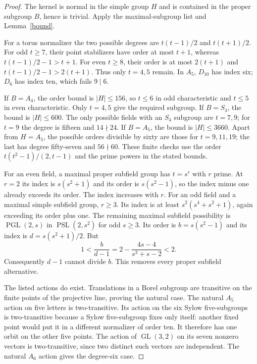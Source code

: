 \documentclass[11pt]{article}
\newcommand{\PSL}{\operatorname{PSL}}
\newcommand{\PGL}{\operatorname{PGL}}
\begin{document}
\begin{proof}
The kernel is normal in the simple group $H$ and is contained in
the proper subgroup $B$, hence is trivial. Apply the maximal-subgroup
list and Lemma~\ref{bound}.

For a torus normalizer the two possible degrees are
$t(t-1)/2$ and $t(t+1)/2$. For odd $t\geq7$, their point
stabilizers have order at most $t+1$, whereas
$t(t-1)/2-1>t+1$. For even $t\geq8$, their order is at most
$2(t+1)$ and $t(t-1)/2-1>2(t+1)$. Thus only $t=4,5$
remain. In $A_5$, $D_{10}$ has index six; $D_6$ has index ten,
which fails $9\mid6$.

If $B=A_4$, the order bound is $|H|\leq156$, so $t\leq6$
in odd characteristic and $t\leq5$ in even characteristic.
Only $t=4,5$ give the required subgroup. If $B=S_4$, the bound
is $|H|\leq600$. The only possible fields with an $S_4$
subgroup are $t=7,9$; for $t=9$ the degree is fifteen and
$14\nmid24$. If $B=A_5$, the bound is $|H|\leq3660$.
Apart from $H=A_5$, the possible orders divisible by sixty are
those for $t=9,11,19$; the last has degree fifty-seven and
$56\nmid60$. These finite checks use the order
$t(t^2-1)/(2,t-1)$ and the prime powers in the stated bounds.

For an even field, a maximal proper subfield group has $t=s^r$
with $r$ prime. At $r=2$ its index is $s(s^2+1)$ and its
order is $s(s^2-1)$, so the index minus one already exceeds
its order. The index increases with $r$. For an odd field and
a maximal simple subfield group, $r\geq3$. Its index is at least
$s^2(s^4+s^2+1)$, again exceeding its order plus one. The
remaining maximal subfield possibility is $\PGL(2,s)$ in
$\PSL(2,s^2)$ for odd $s\geq3$. Its order is
$b=s(s^2-1)$ and its index is $d=s(s^2+1)/2$. But
\[
 1<\frac{b}{d-1}
   =2-\frac{4s-4}{s^3+s-2}<2.
\]
Consequently $d-1$ cannot divide $b$. This removes every proper
subfield alternative.

The listed actions do exist. Translations in a Borel subgroup are
transitive on the finite points of the projective line, proving the
natural case. The natural $A_5$ action on five letters is
two-transitive. Its action on the six Sylow five-subgroups is
two-transitive because a Sylow five-subgroup fixes only itself:
another fixed point would put it in a different normalizer of
order ten. It therefore has one orbit on the other five points.
The action of $\operatorname{GL}(3,2)$ on its seven nonzero vectors
is two-transitive, since two distinct such vectors are independent.
The natural $A_6$ action gives the degree-six case.


\end{proof}
\end{document}
